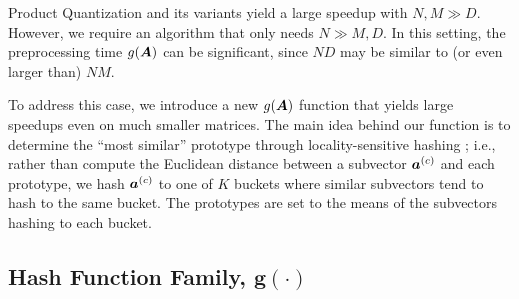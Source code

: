 

Product Quantization and its variants yield a large speedup with $N, M \gg D$. However, we require an algorithm that only needs $N \gg M, D$. In this setting, the preprocessing time $g(\bm{A})$ can be significant, since $ND$ may be similar to (or even larger than) $NM$.

To address this case, we introduce a new $g(\bm{A})$ function that yields large speedups even on much smaller matrices. %
The main idea behind our function is to determine the ``most similar'' prototype through locality-sensitive hashing \cite{lshOrig}; i.e., rather than compute the Euclidean distance between a subvector $\bm{a}^{(c)}$ and each prototype, we hash $\bm{a}^{(c)}$ to one of $K$ buckets where similar subvectors tend to hash to the same bucket. The prototypes are set to the means of the subvectors hashing to each bucket.%


\vspace{-1mm}
\subsection{Hash Function Family, $\bm{g(\cdot)}$}

